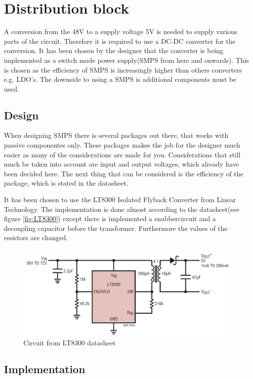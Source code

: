 \section{Distribution block}
\label{sec:SMPS}
A conversion from the 48V to a supply voltage 5V is needed to supply various parts of the circuit. Therefore it is required to use a DC-DC converter for the conversion. It has been chosen by the designer that the converter is being implemented as a switch mode power supply(SMPS from here and onwards). This is chosen as the efficiency of SMPS is increasingly higher than others converters e.g. LDO's. The downside to using a SMPS is additional components must be used.  

\subsection{Design}

When designing SMPS there is several packages out there, that works with passive componentes only. These packages makes the job for the designer much easier as many of the considerations are made for you. Considerations that still much be taken into account are input and output voltages, which already have been decided here. The next thing that can be considered is the efficiency of the package, which is stated in the datasheet.

It has been chosen to use the LT8300 Isolated Flyback Converter from Linear Technology. The implementation is done almost according to the datasheet(see figure \vref{fig:LT8300})  except there is implemented a snubbercircuit and a decoupling capacitor before the transformer. Furthermore the values of the resistors are changed.  \\

\begin{figure}[H]
	\centering
	\includegraphics[width=0.6\linewidth]{Hardware/Pictures/LT8300_circuit}
	\caption{Circuit from LT8300 datasheet}
	\label{fig:LT8300}
\end{figure}

\subsection{Implementation}

